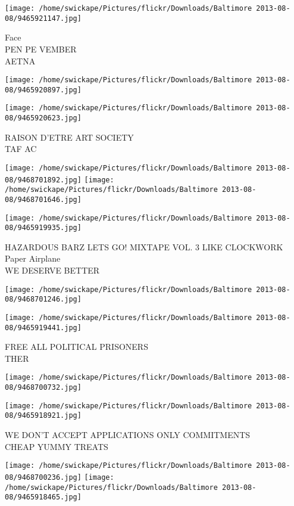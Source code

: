 \documentclass[10pt,letterpaper]{article}
\begin{document}
\texttt{[image: /home/swickape/Pictures/flickr/Downloads/Baltimore 2013-08-08/9465921147.jpg]}

Face\\
PEN PE VEMBER\\
AETNA
\pagebreak

\texttt{[image: /home/swickape/Pictures/flickr/Downloads/Baltimore 2013-08-08/9465920897.jpg]}

\vspace{0.25in}
\texttt{[image: /home/swickape/Pictures/flickr/Downloads/Baltimore 2013-08-08/9465920623.jpg]}

RAISON D'ETRE ART SOCIETY\\
TAF AC
\pagebreak

\texttt{[image: /home/swickape/Pictures/flickr/Downloads/Baltimore 2013-08-08/9468701892.jpg]}
\texttt{[image: /home/swickape/Pictures/flickr/Downloads/Baltimore 2013-08-08/9468701646.jpg]}

\texttt{[image: /home/swickape/Pictures/flickr/Downloads/Baltimore 2013-08-08/9465919935.jpg]}

HAZARDOUS BARZ LETS GO! MIXTAPE VOL. 3 LIKE CLOCKWORK\\
Paper Airplane\\
WE DESERVE BETTER
\pagebreak

\texttt{[image: /home/swickape/Pictures/flickr/Downloads/Baltimore 2013-08-08/9468701246.jpg]}

\vspace{0.25in}
\texttt{[image: /home/swickape/Pictures/flickr/Downloads/Baltimore 2013-08-08/9465919441.jpg]}

FREE ALL POLITICAL PRISONERS\\
THER
\pagebreak

\texttt{[image: /home/swickape/Pictures/flickr/Downloads/Baltimore 2013-08-08/9468700732.jpg]}

\vspace{0.25in}
\texttt{[image: /home/swickape/Pictures/flickr/Downloads/Baltimore 2013-08-08/9465918921.jpg]}

WE DON'T ACCEPT APPLICATIONS ONLY COMMITMENTS\\
CHEAP YUMMY TREATS
\pagebreak

\texttt{[image: /home/swickape/Pictures/flickr/Downloads/Baltimore 2013-08-08/9468700236.jpg]}
\texttt{[image: /home/swickape/Pictures/flickr/Downloads/Baltimore 2013-08-08/9465918465.jpg]}
\end{document}
